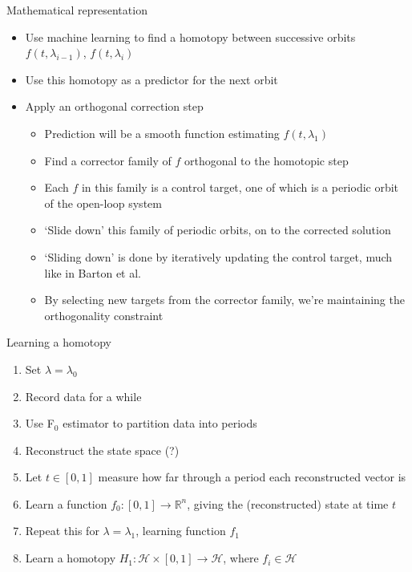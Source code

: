 \documentclass[presentation]{beamer}
\begin{document}
\begin{frame}[label={sec:orged004a6}]{Mathematical representation}
\begin{itemize}
\item Use machine learning to find a homotopy between successive orbits \(f(t, \lambda_{i-1})\), \(f(t, \lambda_i)\)
\item Use this homotopy as a predictor for the next orbit
\item Apply an orthogonal correction step
\begin{itemize}
\item Prediction will be a smooth function estimating \(f(t, \lambda_1)\)
\item Find a corrector family of \(f\) orthogonal to the homotopic step
\item Each \(f\) in this family is a control target, one of which is a periodic orbit of the open-loop system
\item `Slide down' this family of periodic orbits, on to the corrected solution
\item `Sliding down' is done by iteratively updating the control target, much like in Barton et al.
\item By selecting new targets from the corrector family, we're maintaining the orthogonality constraint
\end{itemize}
\end{itemize}
\end{frame}

\begin{frame}[label={sec:org66ca0c3}]{Learning a homotopy}
\begin{enumerate}
\item Set \(\lambda = \lambda_0\)
\item Record data for a while
\item Use F\(_{\text{0}}\) estimator to partition data into periods
\item Reconstruct the state space (?)
\item Let \(t \in [0,1]\) measure how far through a period each reconstructed vector is
\item Learn a function \(f_0: [0,1] \to \mathbb{R}^n\), giving the (reconstructed) state at time \(t\)
\item Repeat this for \(\lambda = \lambda_1\), learning function \(f_1\)
\item Learn a homotopy \(H_1: \mathcal{H}\times [0,1] \to \mathcal{H}\), where \(f_i \in \mathcal{H}\)
\end{enumerate}
\end{frame}
\end{document}
